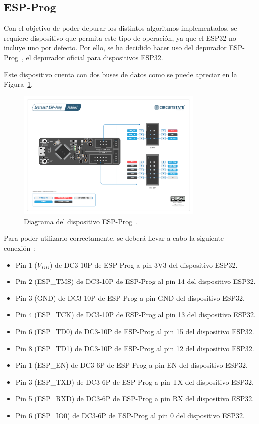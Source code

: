 \subsection{ESP-Prog}\label{subsec:esp-prog}

Con el objetivo de poder depurar los distintos algoritmos implementados, se requiere dispositivo que permita este tipo de operación, ya que el ESP32 no incluye uno por defecto.
Por ello, se ha decidido hacer uso del depurador ESP-Prog~\cite{esp-prog}, el depurador oficial para dispositivos ESP32.

Este dispositivo cuenta con dos buses de datos como se puede apreciar en la Figura~\ref{fig:esp-prog-pinout}.

\begin{figure}[h]
    \centering
    \includegraphics[width=0.8\textwidth]{figures/esp-prog-pinout.pdf}
    \caption{Diagrama del dispositivo ESP-Prog~\cite{esp-prog-pinout}.}
    \label{fig:esp-prog-pinout}
\end{figure}

Para poder utilizarlo correctamente, se deberá llevar a cabo la siguiente conexión~\cite{esp-prog-conn}:

\begin{itemize}
    \item Pin 1 ($V_{DD}$) de DC3-10P de ESP-Prog a pin 3V3 del dispositivo ESP32.
    \item Pin 2 (ESP\_TMS) de DC3-10P de ESP-Prog al pin 14 del dispositivo ESP32.
    \item Pin 3 (GND) de DC3-10P de ESP-Prog a pin GND del dispositivo ESP32.
    \item Pin 4 (ESP\_TCK) de DC3-10P de ESP-Prog al pin 13 del dispositivo ESP32.
    \item Pin 6 (ESP\_TD0) de DC3-10P de ESP-Prog al pin 15 del dispositivo ESP32.
    \item Pin 8 (ESP\_TD1) de DC3-10P de ESP-Prog al pin 12 del dispositivo ESP32.
    \item Pin 1 (ESP\_EN) de DC3-6P de ESP-Prog a pin EN del dispositivo ESP32.
    \item Pin 3 (ESP\_TXD) de DC3-6P de ESP-Prog a pin TX del dispositivo ESP32.
    \item Pin 5 (ESP\_RXD) de DC3-6P de ESP-Prog a pin RX del dispositivo ESP32.
    \item Pin 6 (ESP\_IO0) de DC3-6P de ESP-Prog al pin 0 del dispositivo ESP32.
\end{itemize}

